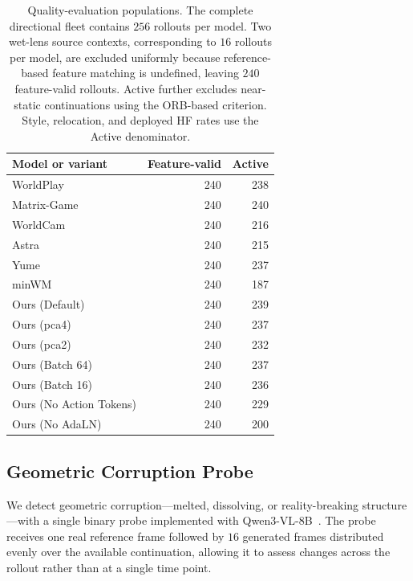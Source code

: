 \begin{table}[t]
\centering
{
\small
\begin{tabular}{lrr}
\toprule
Model or variant & Feature-valid & Active \\
\midrule
WorldPlay              & 240 & 238 \\
Matrix-Game            & 240 & 240 \\
WorldCam               & 240 & 216 \\
Astra                  & 240 & 215 \\
Yume                   & 240 & 237 \\
minWM                  & 240 & 187 \\
\midrule
Ours (Default)         & 240 & 239 \\
Ours (pca4)            & 240 & 237 \\
Ours (pca2)            & 240 & 232 \\
Ours (Batch 64)        & 240 & 237 \\
Ours (Batch 16)        & 240 & 236 \\
Ours (No Action Tokens)& 240 & 229 \\
Ours (No AdaLN)        & 240 & 200 \\
\bottomrule
\end{tabular}
}
\caption{
    Quality-evaluation populations. The complete directional fleet contains
    $256$ rollouts per model. Two wet-lens source contexts, corresponding to
    $16$ rollouts per model, are excluded uniformly because reference-based
    feature matching is undefined, leaving $240$ feature-valid rollouts.
    Active further excludes near-static continuations using the ORB-based
    criterion. Style, relocation, and deployed HF rates use the Active
    denominator.
}
\label{tab:quality_denominators}
\end{table}


\subsection{Geometric Corruption Probe}
\label{app:vlm_quality_probes}

We detect geometric corruption---melted, dissolving, or reality-breaking
structure---with a single binary probe implemented with Qwen3-VL-8B~\cite{QWEN}.
The probe receives one real reference frame followed by $16$ generated frames
distributed evenly over the available continuation, allowing it to assess
changes across the rollout rather than at a single time point.

